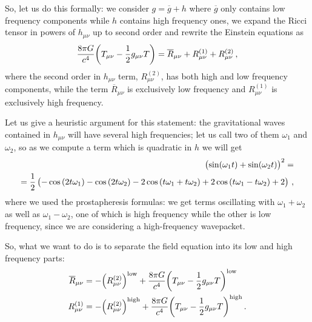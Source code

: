 \documentclass[main.tex]{subfiles}
\begin{document}




So, let us do this formally: we consider \(g = \overline{g} + h\) where \(\overline{g}\) only contains low frequency components while \(h\) contains high frequency ones, we expand the Ricci tensor in powers of \(h_{\mu \nu }\) up to second order and rewrite the Einstein equations as 
%
\begin{align}
\frac{8 \pi G}{c^{4}} \qty(T_{\mu \nu } - \frac{1}{2} g_{\mu \nu }T)
= \overline{R}_{\mu \nu } 
+ R^{(1)}_{\mu \nu } 
+ R^{(2)}_{\mu \nu } 
\,,
\end{align}
%
where the second order in \(h_{\mu \nu }\) term, \(R^{(2)}_{\mu \nu }\), has both high and low frequency components, while the term \(\overline{R}_{\mu \nu }\) is exclusively low frequency and \(R_{\mu \nu }^{(1)}\) is exclusively high frequency.

Let us give a heuristic argument for this statement: the gravitational waves contained in \(h_{\mu \nu } \) will have several high frequencies; let us call two of them \(\omega_1  \) and \(\omega_2 \), so as we compute a term which is quadratic in \(h\) we will get
%
\begin{align}
\qty(\sin(\omega_{1} t) + \sin(\omega_2 t))^2 
= \\ =
\frac{1}{2} \left(-\cos \left(2 t \omega _1\right)-\cos \left(2 t \omega _2\right)-2 \cos \left(t \omega _1+t \omega _2\right)+2 \cos \left(t \omega _1-t \omega _2\right)+2\right)
\,,
\end{align}
%
where we used the prostapheresis formulas: we get terms oscillating with \(\omega_1 + \omega_2 \) as well as \(\omega_1 - \omega_2 \), one of which is high frequency while the other is low frequency, since we are considering a high-frequency wavepacket.

So, what we want to do is to separate the field equation into its low and high frequency parts: 
%
\begin{align} \label{eq:low-frequency-ricci-tensor-contribution}
\overline{R}_{\mu \nu } &= - \qty(R_{\mu \nu }^{(2)})^{\text{low}} + \frac{8 \pi G}{c^{4}} \qty(T_{\mu \nu } - \frac{1}{2} g_{\mu \nu } T)^{\text{low}} \\
R_{\mu \nu }^{(1)} &= - \qty(R_{\mu \nu }^{(2)})^{\text{high}} + \frac{8 \pi G}{c^{4}} \qty(T_{\mu \nu } - \frac{1}{2} g_{\mu \nu } T)^{\text{high}} 
\,.
\end{align}
\end{document}
